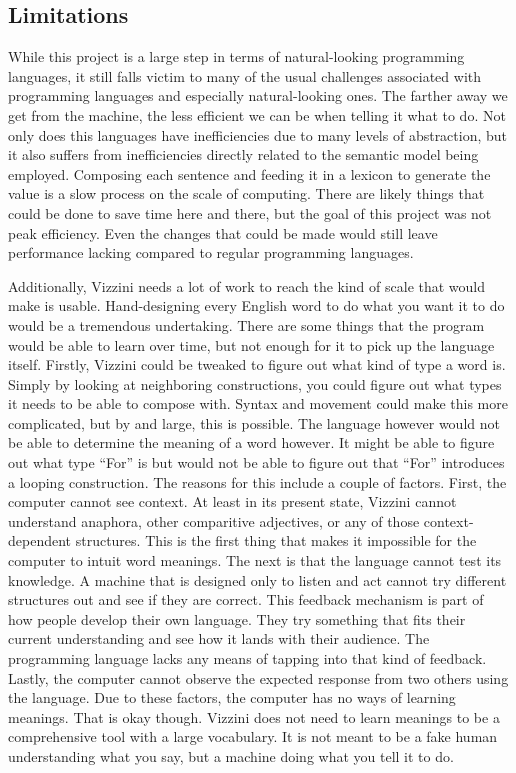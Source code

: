 \documentclass[titlepage]{article}
\newcommand{\langName}{Vizzini}
\begin{document}
\subsection*{Limitations}
While this project is a large step in terms of natural-looking programming languages, it still falls victim to many of the usual challenges associated with programming languages and especially natural-looking ones. The farther away we get from the machine, the less efficient we can be when telling it what to do. Not only does this languages have inefficiencies due to many levels of abstraction, but it also suffers from inefficiencies directly related to the semantic model being employed. Composing each sentence and feeding it in a lexicon to generate the value is a slow process on the scale of computing. There are likely things that could be done to save time here and there, but the goal of this project was not peak efficiency. Even the changes that could be made would still leave performance lacking compared to regular programming languages.

Additionally, \langName{} needs a lot of work to reach the kind of scale that would make is usable. Hand-designing every English word to do what you want it to do would be a tremendous undertaking. There are some things that the program would be able to learn over time, but not enough for it to pick up the language itself. Firstly, \langName{} could be tweaked to figure out what kind of type a word is. Simply by looking at neighboring constructions, you could figure out what types it needs to be able to compose with. Syntax and movement could make this more complicated, but by and large, this is possible. The language however would not be able to determine the meaning of a word however. It might be able to figure out what type ``For'' is but would not be able to figure out that ``For'' introduces a looping construction. The reasons for this include a couple of factors. First, the computer cannot see context. At least in its present state, \langName{} cannot understand anaphora, other comparitive adjectives, or any of those context-dependent structures. This is the first thing that makes it impossible for the computer to intuit word meanings. The next is that the language cannot test its knowledge. A machine that is designed only to listen and act cannot try different structures out and see if they are correct. This feedback mechanism is part of how people develop their own language. They try something that fits their current understanding and see how it lands with their audience. The programming language lacks any means of tapping into that kind of feedback. Lastly, the computer cannot observe the expected response from two others using the language. Due to these factors, the computer has no ways of learning meanings. That is okay though. \langName{} does not need to learn meanings to be a comprehensive tool with a large vocabulary. It is not meant to be a fake human understanding what you say, but a machine doing what you tell it to do.
\end{document}
